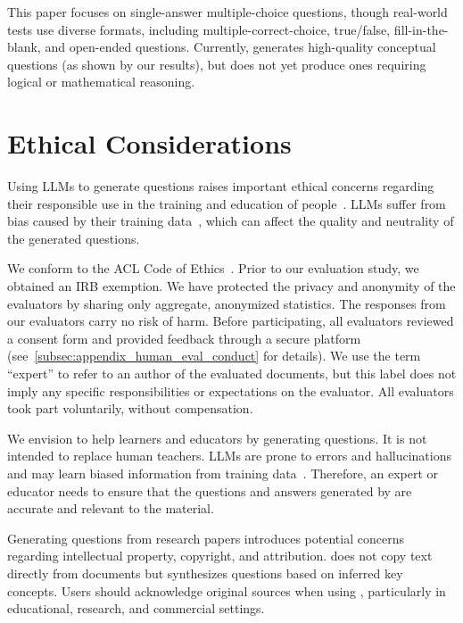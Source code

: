  This paper focuses on single-answer multiple-choice questions, though real-world tests use diverse formats, including multiple-correct-choice, true/false, fill-in-the-blank, and open-ended questions. Currently, \name generates high-quality conceptual questions (as shown by our results), but does not yet produce ones requiring logical or mathematical reasoning.



\section*{Ethical Considerations}

Using LLMs to generate questions raises important ethical concerns regarding their responsible use in the training and education of people~\cite{MIT_law}. LLMs suffer from bias caused by their training data~\cite{bender2021dangers}, which can affect the quality and neutrality of the generated questions.

We conform to the ACL Code of Ethics~\cite{ACLCodeOfEthics}. Prior to our evaluation study, we obtained an IRB exemption. We have protected the privacy and anonymity of the evaluators by sharing only aggregate, anonymized statistics. The responses from our evaluators carry no risk of harm. Before participating, all evaluators reviewed a consent form and provided feedback through a secure platform (see~\autoref{subsec:appendix_human_eval_conduct} for details). We use the term ``expert'' to refer to an author of the evaluated documents, but this label does not imply any specific responsibilities or expectations on the evaluator. All evaluators took part voluntarily, without compensation.

We envision \name to help learners and educators by generating questions. It is not intended to replace human teachers. LLMs are prone to errors and hallucinations and may learn biased information from training data~\cite{MIT_law}. Therefore, an expert or educator needs to ensure that the questions and answers generated by \name are accurate and relevant to the material.  

Generating questions from research papers introduces potential concerns regarding intellectual property, copyright, and attribution. \name does not copy text directly from documents but synthesizes questions based on inferred key concepts. Users should acknowledge original sources when using \name, particularly in educational, research, and commercial settings.
